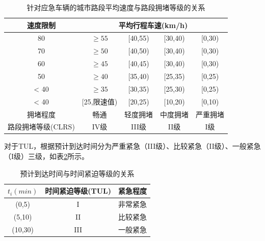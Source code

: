 \begin{table}[H]
	\centering  %
	\caption{针对应急车辆的城市路段平均速度与路段拥堵等级的关系}  %
	\label{table:CLRS}  %
	\begin{tabular}{|c|cccc|}  
		\hline  
		速度限制 & \multicolumn{4}{c}{ 平均行程车速(km/h)} \vline \\  %
		\hline
		80 & ${\geq{55}}$ & {[}40,55) & {[}30,40) & {[}0,30) \\ 
		\hline
		70 & ${\geq{50}}$ & {[}40,50) & {[}30,40) & {[}0,30) \\ 
		\hline
		60 & ${\geq{45}}$ & {[}40,45) & {[}30,40) & {[}0,30) \\ 
		\hline
		50 & ${\geq{40}}$ & {[}35,40) & {[}25,35) & {[}0,25) \\ 
		\hline
		< 40 & ${\geq{35}}$ & {[}30,35) & {[}25,30) & {[}0,25) \\ 
		\hline
		< 40 & {[}25,限速值) & {[}20,25) & {[}10,20) & {[}0,10) \\
		\hline
		拥堵程度 & 畅通 & 轻度拥堵 & 中度拥堵 & 严重拥堵 \\
		\hline
		路段拥堵等级(CLRS) & IV级 & III级 & II级 & I级 \\
		\hline
	\end{tabular}
\end{table}


对于TUL，根据预计到达时间分为严重紧急（III级）、比较紧急（II级）、一般紧急（I级）三级，如表\ref{table:TUL}所示。

\begin{table}[H]
	\centering
	\caption{预计到达时间与时间紧迫等级的关系}
	\label{table:TUL}
	\begin{tabular}{|c|c|c|}
		\hline
		${t_i}(min)$ & 时间紧迫等级(TUL) & 紧急程度 \\ \hline
		(0,5) & I & 非常紧急 \\ \hline
		(5,10) & II & 比较紧急 \\ \hline
		(10,30) & III & 一般紧急 \\ \hline
	\end{tabular}
\end{table}


